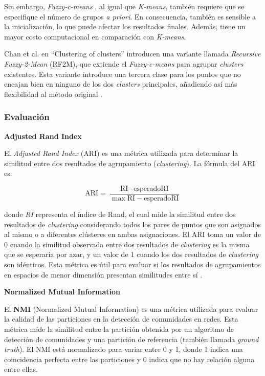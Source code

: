 \documentclass[11pt,a4paper,twoside,openany]{tesis}
\begin{document}
Sin embargo, \emph{Fuzzy-c-means} , al igual que \emph{K-means},  también requiere que se especifique el número de grupos \emph{a priori}. En consecuencia, también es sensible a la inicialización, lo que puede afectar los resultados finales. Además, tiene un mayor costo computacional en comparación con \emph{K-means}.

Chan et al. en ``Clustering of clusters'' introducen una variante llamada \emph{Recursive Fuzzy-2-Mean} (RF2M), que extiende el \emph{Fuzzy-c-means} para agrupar \emph{clusters} existentes. Esta variante introduce una tercera clase para los puntos que no encajan bien en ninguno de los dos \emph{clusters} principales, añadiendo así más flexibilidad al método original \cite{fuzzy-k-means}.

\newpage
\subsubsection{Evaluación} \textbf{ }

\textbf{Adjusted Rand Index}

El \textit{Adjusted Rand Index} (ARI) es una métrica utilizada para determinar la similitud entre dos resultados de agrupamiento (\emph{clustering}). La fórmula del ARI es:

\begin{equation}
\text{ARI} = \frac{\text{RI} - \text{esperadoRI}}{\max \text{RI} - \text{esperadoRI}}
\end{equation}

donde \textit{RI} representa el índice de Rand, el cual mide la similitud entre dos resultados de \emph{clustering} considerando todos los pares de puntos que son asignados al mismo o a diferentes clústeres en ambas asignaciones. El ARI toma un valor de 0 cuando la similitud observada entre dos resultados de \emph{clustering} es la misma que se esperaría por azar, y un valor de 1 cuando los dos resultados de \emph{clustering} son idénticos. Esta métrica es útil para evaluar si los resultados de agrupamientos en espacios de menor dimensión presentan similitudes entre sí \cite{ari}.


\textbf{Normalized Mutual Information}

El \textbf{NMI} (Normalized Mutual Information) es una métrica utilizada para evaluar la calidad de las particiones en la detección de comunidades en redes. Esta métrica mide la similitud entre la partición obtenida por un algoritmo de detección de comunidades y una partición de referencia (también llamada \emph{ground truth}). El NMI está normalizado para variar entre 0 y 1, donde 1 indica una coincidencia perfecta entre las particiones y 0 indica que no hay relación alguna entre ellas.
\end{document}
